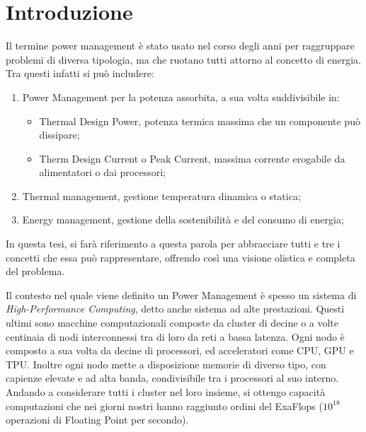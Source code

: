 \chapter{Introduzione}
Il termine power management è stato usato nel corso degli anni per raggruppare problemi di diversa tipologia, ma che ruotano tutti attorno al concetto di energia.
Tra questi infatti si può includere:
\begin{enumerate}
    \item Power Management per la potenza assorbita, a sua volta suddivisibile in:
    \begin{itemize}
        \item Thermal Design Power, potenza termica massima che un componente può dissipare;
        \item Therm Design Current o Peak Current, massima corrente erogabile da alimentatori o dai processori;
    \end{itemize}
    \item Thermal management, gestione temperatura dinamica o statica;
    \item Energy management, gestione della sostenibilità e del consumo di energia;
\end{enumerate}

\noindent In questa tesi, si farà riferimento a questa parola per abbracciare tutti e tre i concetti che essa può rappresentare, offrendo così una visione olistica e completa del problema.

Il contesto nel quale viene definito un Power Management è spesso un sistema di \emph{High-Performance Computing}, detto anche sistema ad alte prestazioni. Questi ultimi sono macchine computazionali composte da cluster di decine o a volte centinaia di nodi interconnessi tra di loro da reti a bassa latenza. Ogni nodo è composto a sua volta da decine di processori, ed acceleratori come CPU, GPU e TPU.
Inoltre ogni nodo mette a disposizione memorie di diverso tipo, con capienze elevate e ad alta banda, condivisibile tra i processori al suo interno. Andando a considerare tutti i cluster nel loro insieme, si ottengo capacità computazioni che nei giorni nostri hanno raggiunto ordini del ExaFlops ($10^{18}$ operazioni di Floating Point per secondo). 

